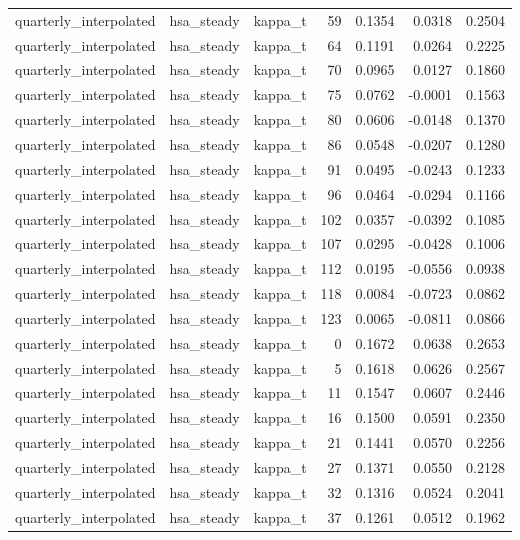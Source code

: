 \begin{tabular}{lllrrrr}
quarterly\_interpolated & hsa\_steady & kappa\_t & 59 & 0.1354 & 0.0318 & 0.2504 \\
quarterly\_interpolated & hsa\_steady & kappa\_t & 64 & 0.1191 & 0.0264 & 0.2225 \\
quarterly\_interpolated & hsa\_steady & kappa\_t & 70 & 0.0965 & 0.0127 & 0.1860 \\
quarterly\_interpolated & hsa\_steady & kappa\_t & 75 & 0.0762 & -0.0001 & 0.1563 \\
quarterly\_interpolated & hsa\_steady & kappa\_t & 80 & 0.0606 & -0.0148 & 0.1370 \\
quarterly\_interpolated & hsa\_steady & kappa\_t & 86 & 0.0548 & -0.0207 & 0.1280 \\
quarterly\_interpolated & hsa\_steady & kappa\_t & 91 & 0.0495 & -0.0243 & 0.1233 \\
quarterly\_interpolated & hsa\_steady & kappa\_t & 96 & 0.0464 & -0.0294 & 0.1166 \\
quarterly\_interpolated & hsa\_steady & kappa\_t & 102 & 0.0357 & -0.0392 & 0.1085 \\
quarterly\_interpolated & hsa\_steady & kappa\_t & 107 & 0.0295 & -0.0428 & 0.1006 \\
quarterly\_interpolated & hsa\_steady & kappa\_t & 112 & 0.0195 & -0.0556 & 0.0938 \\
quarterly\_interpolated & hsa\_steady & kappa\_t & 118 & 0.0084 & -0.0723 & 0.0862 \\
quarterly\_interpolated & hsa\_steady & kappa\_t & 123 & 0.0065 & -0.0811 & 0.0866 \\
quarterly\_interpolated & hsa\_steady & kappa\_t & 0 & 0.1672 & 0.0638 & 0.2653 \\
quarterly\_interpolated & hsa\_steady & kappa\_t & 5 & 0.1618 & 0.0626 & 0.2567 \\
quarterly\_interpolated & hsa\_steady & kappa\_t & 11 & 0.1547 & 0.0607 & 0.2446 \\
quarterly\_interpolated & hsa\_steady & kappa\_t & 16 & 0.1500 & 0.0591 & 0.2350 \\
quarterly\_interpolated & hsa\_steady & kappa\_t & 21 & 0.1441 & 0.0570 & 0.2256 \\
quarterly\_interpolated & hsa\_steady & kappa\_t & 27 & 0.1371 & 0.0550 & 0.2128 \\
quarterly\_interpolated & hsa\_steady & kappa\_t & 32 & 0.1316 & 0.0524 & 0.2041 \\
quarterly\_interpolated & hsa\_steady & kappa\_t & 37 & 0.1261 & 0.0512 & 0.1962 \\

\end{tabular}

